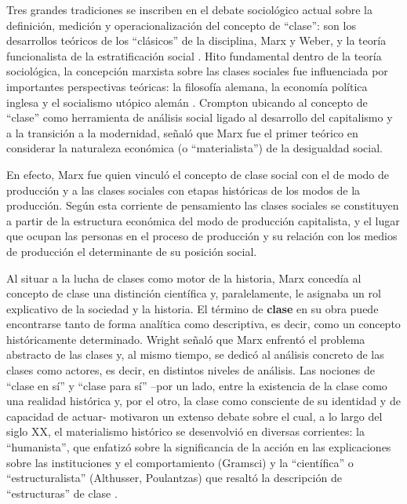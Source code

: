 \documentclass[
]{book}
\begin{document}
Tres grandes tradiciones se inscriben en el debate sociológico actual sobre la definición, medición y operacionalización del concepto de ``clase'': son los desarrollos teóricos de los ``clásicos'' de la disciplina, Marx y Weber, y la teoría funcionalista de la estratificación social \citep{Crompton2008}. Hito fundamental dentro de la teoría sociológica, la concepción marxista sobre las clases sociales fue influenciada por importantes perspectivas teóricas: la filosofía alemana, la economía política inglesa y el socialismo utópico alemán \citep{Ossowski1972}. Crompton \citeyearpar[p.~11]{Crompton2008} ubicando al concepto de ``clase'' como herramienta de análisis social ligado al desarrollo del capitalismo y a la transición a la modernidad, señaló que Marx fue el primer teórico en considerar la naturaleza económica (o ``materialista'') de la desigualdad social.

En efecto, Marx fue quien vinculó el concepto de clase social con el de modo de producción y a las clases sociales con etapas históricas de los modos de la producción. Según esta corriente de pensamiento las clases sociales se constituyen a partir de la estructura económica del modo de producción capitalista, y el lugar que ocupan las personas en el proceso de producción y su relación con los medios de producción el determinante de su posición social.

Al situar a la lucha de clases como motor de la historia, Marx concedía al concepto de clase una distinción científica y, paralelamente, le asignaba un rol explicativo de la sociedad y la historia. El término de \textbf{clase} en su obra puede encontrarse tanto de forma analítica como descriptiva, es decir, como un concepto históricamente determinado. Wright \citeyearpar{Wright1997} señaló que Marx enfrentó el problema abstracto de las clases y, al mismo tiempo, se dedicó al análisis concreto de las clases como actores, es decir, en distintos niveles de análisis. Las nociones de ``clase en sí'' y ``clase para sí'' --por un lado, entre la existencia de la clase como una realidad histórica y, por el otro, la clase como consciente de su identidad y de capacidad de actuar- motivaron un extenso debate sobre el cual, a lo largo del siglo XX, el materialismo histórico se desenvolvió en diversas corrientes: la ``humanista'', que enfatizó sobre la significancia de la acción en las explicaciones sobre las instituciones y el comportamiento (Gramsci) y la ``científica'' o ``estructuralista'' (Althusser, Poulantzas) que resaltó la descripción de ``estructuras'' de clase \citep[p.~31]{Crompton2008}.
\end{document}
